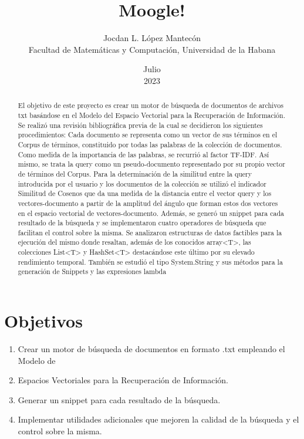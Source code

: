 \documentclass[a4paper,12pt,twocolumn]{article}
\begin{document}
\title{Moogle!}
\author{Jocdan L. López Mantecón \\ Facultad de Matemáticas y Computación, Universidad de la Habana}
\date{Julio \\ 2023}
\maketitle

\begin{abstract}
El objetivo de este proyecto es crear un motor de búsqueda de documentos de archivos txt
basándose en el Modelo del Espacio Vectorial para la Recuperación de Información. Se realizó
una revisión bibliográfica previa de la cual se decidieron los siguientes procedimientos: Cada
documento se representa como un vector de sus términos en el Corpus de términos, constituido
por todas las palabras de la colección de documentos. Como medida de la importancia de las
palabras, se recurrió al factor TF-IDF. Así mismo, se trata la query como un pseudo-documento
representado por su propio vector de términos del Corpus. Para la determinación de la similitud
entre la query introducida por el usuario y los documentos de la colección se utilizó el indicador
Similitud de Cosenos que da una medida de la distancia entre el vector query y los vectores-documento
a partir de la amplitud del ángulo que forman estos dos vectores en el espacio
vectorial de vectores-documento. Además, se generó un snippet para cada resultado de la
búsqueda y se implementaron cuatro operadores de búsqueda que facilitan el control sobre la
misma.
Se analizaron estructuras de datos factibles para la ejecución del mismo donde
resaltan, además de los conocidos array<T>, las colecciones List<T> y HashSet<T>
destacándose este último por su elevado rendimiento temporal. También se estudió el tipo
System.String y sus métodos para la generación de Snippets y las expresiones lambda
\end{abstract}

\section*{Objetivos}
\begin{enumerate}
    \item Crear un motor de búsqueda de documentos en formato .txt empleando el Modelo de
    \item Espacios Vectoriales para la Recuperación de Información.
    \item Generar un snippet para cada resultado de la búsqueda.
    \item Implementar utilidades adicionales que mejoren la calidad de la búsqueda y el
    control sobre la misma.
    \end{enumerate}
\end{document}
